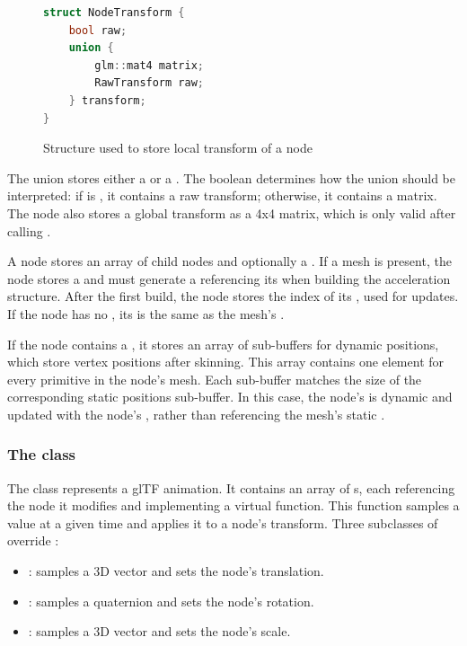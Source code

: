 \begin{figure}[H]
\begin{lstlisting}[language=C++]
struct NodeTransform {
    bool raw;
    union {
        glm::mat4 matrix;
        RawTransform raw;
    } transform;
}
\end{lstlisting}
\caption{Structure used to store local transform of a node}
\label{fig:node-transform}
\end{figure}

The union  stores either a  or a . The boolean  determines how the union should be interpreted: if  is , it contains a raw transform; otherwise, it contains a matrix. The node also stores a global transform as a 4x4 matrix, which is only valid after calling .

A node stores an array of child nodes and optionally a . If a mesh is present, the node stores a  and must generate a  referencing its  when building the acceleration structure. After the first build, the node stores the index of its , used for updates. If the node has no , its  is the same as the mesh's .

If the node contains a , it stores an array of sub-buffers for dynamic positions, which store vertex positions after skinning. This array contains one element for every primitive in the node's mesh. Each sub-buffer matches the size of the corresponding static positions sub-buffer. In this case, the node's  is dynamic and updated with the node's , rather than referencing the mesh's static .

\subsubsection{The  class}

The  class represents a glTF animation. It contains an array of s, each referencing the node it modifies and implementing a virtual  function. This function samples a value at a given time and applies it to a node's transform. Three subclasses of  override :

\begin{itemize}
    \item {}: samples a 3D vector and sets the node's translation.
    \item {}: samples a quaternion and sets the node's rotation.
    \item {}: samples a 3D vector and sets the node's scale.
\end{itemize}


